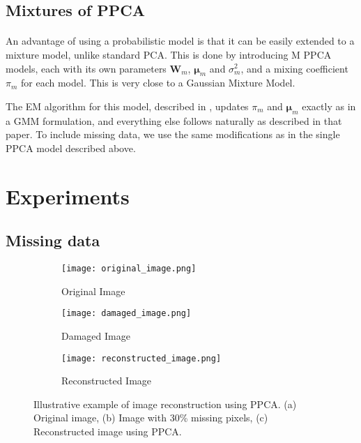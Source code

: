 \documentclass{article}
\begin{document}
\subsection{Mixtures of PPCA}
\label{sec:mppca}

\paragraph{} An advantage of using a probabilistic model is that it can be easily extended to a mixture model, unlike standard PCA. This is done by introducing M PPCA models, each with its own parameters $\mathbf{W}_m$, $\boldsymbol{\mu}_m$ and $\sigma^2_m$, and a mixing coefficient $\pi_m$ for each model. This is very close to a Gaussian Mixture Model.

The EM algorithm for this model, described in \citet{MPPCA}, updates $\pi_m$ and $\boldsymbol{\mu}_m$ exactly as in a GMM formulation, and everything else follows naturally as described in that paper. To include missing data, we use the same modifications as in the single PPCA model described above.

\section{Experiments}

\subsection{Missing data}

\begin{figure}[H]
    \centering
    \begin{subfigure}[b]{0.3\textwidth}
        \centering
        \texttt{[image: original\_image.png]}
        \caption{Original Image}
        \label{fig:original_image}
    \end{subfigure}
    \hfill
    \begin{subfigure}[b]{0.3\textwidth}
        \centering
        \texttt{[image: damaged\_image.png]}
        \caption{Damaged Image}
        \label{fig:damaged_image}
    \end{subfigure}
    \hfill
    \begin{subfigure}[b]{0.3\textwidth}
        \centering
        \texttt{[image: reconstructed\_image.png]}
        \caption{Reconstructed Image}
        \label{fig:reconstructed_image}
    \end{subfigure}
    \caption{Illustrative example of image reconstruction using PPCA. (a) Original image, (b) Image with 30\% missing pixels, (c) Reconstructed image using PPCA.}
    \label{fig:mnist_reconstruction}
\end{figure}
\end{document}
